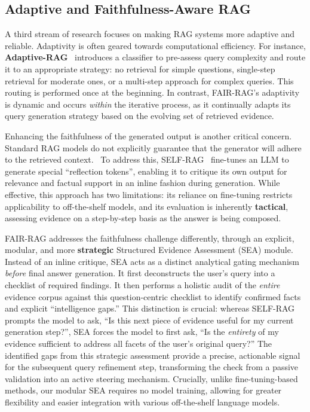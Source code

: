 \documentclass[11pt]{article}
\begin{document}
\subsection{Adaptive and Faithfulness-Aware RAG}

A third stream of research focuses on making RAG systems more adaptive and reliable. Adaptivity is often geared towards computational efficiency. For instance, \textbf{Adaptive-RAG}~\cite{jeong2024adaptiveraglearningadaptretrievalaugmented} introduces a classifier to pre-assess query complexity and route it to an appropriate strategy: no retrieval for simple questions, single-step retrieval for moderate ones, or a multi-step approach for complex queries. This routing is performed once at the beginning. In contrast, FAIR-RAG's adaptivity is dynamic and occurs \emph{within} the iterative process, as it continually adapts its query generation strategy based on the evolving set of retrieved evidence. 

Enhancing the faithfulness of the generated output is another critical concern. Standard RAG models do not explicitly guarantee that the generator will adhere to the retrieved context.~\cite{es2025ragasautomatedevaluationretrieval} To address this, SELF-RAG~\cite{asai2023self} fine-tunes an LLM to generate special ``reflection tokens'', enabling it to critique its own output for relevance and factual support in an inline fashion during generation. While effective, this approach has two limitations: its reliance on fine-tuning restricts applicability to off-the-shelf models, and its evaluation is inherently \textbf{tactical}, assessing evidence on a step-by-step basis as the answer is being composed. 

FAIR-RAG addresses the faithfulness challenge differently, through an explicit, modular, and more \textbf{strategic} Structured Evidence Assessment (SEA) module. Instead of an inline critique, SEA acts as a distinct analytical gating mechanism \emph{before} final answer generation. It first deconstructs the user's query into a checklist of required findings. It then performs a holistic audit of the \emph{entire} evidence corpus against this question-centric checklist to identify confirmed facts and explicit ``intelligence gaps.'' This distinction is crucial: whereas SELF-RAG prompts the model to ask, ``Is this next piece of evidence useful for my current generation step?'', SEA forces the model to first ask, ``Is the \emph{entirety} of my evidence sufficient to address all facets of the user's original query?'' The identified gaps from this strategic assessment provide a precise, actionable signal for the subsequent query refinement step, transforming the check from a passive validation into an active steering mechanism. Crucially, unlike fine-tuning-based methods, our modular SEA requires no model training, allowing for greater flexibility and easier integration with various off-the-shelf language models.
\end{document}
